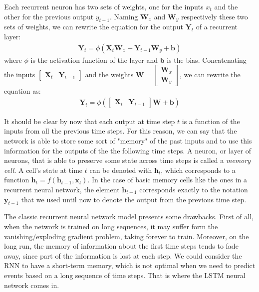 Each recurrent neuron has two sets of weights, one for the inputs $x_t$ and the other for the previous output $y_{t-1}$. Naming $\mathbf{W}_x$ and $\mathbf{W}_y$ respectively these two sets of weights, we can rewrite the equation for the output $\mathbf{Y}_t$ of a recurrent layer:
\begin{align}
    \mathbf{Y}_t = \phi (\mathbf{X}_t \mathbf{W}_x + \mathbf{Y}_{t-1} \mathbf{W}_y + \mathbf{b})
\end{align}
where $\phi$ is the activation function of the layer and $\mathbf{b}$ is the bias. Concatenating the inputs $[\begin{array}{ll}{\mathbf{X}_t} & {\mathbf{Y}_{t-1}}\end{array}]$ and the weights $\mathbf{W} = \left[\begin{array}{c}{\mathbf{W}_x} \\ {\mathbf{W}_y}\end{array}\right]$, we can rewrite the equation as:
    \begin{align}
        \mathbf{Y}_t = \phi ([\begin{array}{ll}{\mathbf{X}_t} & {\mathbf{Y}_{t-1}}\end{array}] \mathbf{W} + \mathbf{b})
    \end{align}

It should be clear by now that each output at time step $t$ is a function of the inputs from all the previous time steps. For this reason, we can say that the network is able to store some sort of "memory" of the past inputs and to use this information for the outputs of the the following time steps. A neuron, or layer of neurons, that is able to preserve some state across time steps is called a \textit{memory cell}. A cell's state at time $t$ can be denoted with $\mathbf{h}_t$, which corresponds to a function $\mathbf{h}_t = f(\mathbf{h}_{t-1}, \mathbf{x}_t)$. In the case of basic memory cells like the ones in a recurrent neural network, the element $\mathbf{h}_{t-1}$ corresponds exactly to the notation $\mathbf{y}_{t-1}$ that we used until now to denote the output from the previous time step.

The classic recurrent neural network model presents some drawbacks. First of all, when the network is trained on long sequences, it may suffer form the vanishing/exploding gradient problem, taking forever to train. Moreover, on the long run, the memory of information about the first time steps tends to fade away, since part of the information is lost at each step. We could consider the RNN to have a short-term memory, which is not optimal when we need to predict events based on a long sequence of time steps. That is where the LSTM neural network comes in.

